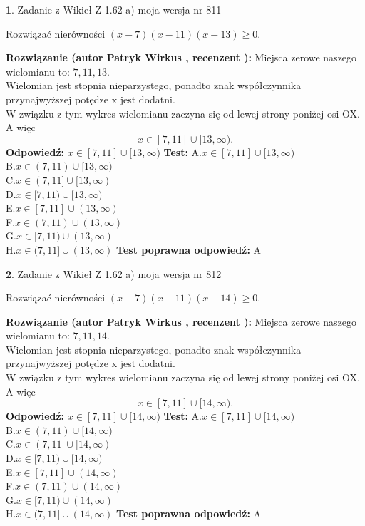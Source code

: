 \documentclass[12pt, a4paper]{article}
\theoremstyle{definition} %
\newtheorem{zad}{}
\newcommand{\zadStart}[1]{\begin{zad}#1\newline}
\newcommand{\zadStop}{\end{zad}}
\newcommand{\rozwStart}[2]{\noindent \textbf{Rozwiązanie (autor #1 , recenzent #2): }\newline}
\newcommand{\rozwStop}{\newline}
\newcommand{\odpStart}{\noindent \textbf{Odpowiedź:}\newline}
\newcommand{\odpStop}{\newline}
\newcommand{\testStart}{\noindent \textbf{Test:}\newline}
\newcommand{\testStop}{\newline}
\newcommand{\kluczStart}{\noindent \textbf{Test poprawna odpowiedź:}\newline}
\newcommand{\kluczStop}{\newline}
\begin{document}
\zadStart{Zadanie z Wikieł Z 1.62 a) moja wersja nr 811}

Rozwiązać nierówności $(x-7)(x-11)(x-13)\ge0$.
\zadStop
\rozwStart{Patryk Wirkus}{}
Miejsca zerowe naszego wielomianu to: $7, 11, 13$.\\
Wielomian jest stopnia nieparzystego, ponadto znak współczynnika przy\linebreak najwyższej potędze x jest dodatni.\\ W związku z tym wykres wielomianu zaczyna się od lewej strony poniżej osi OX. A więc $$x \in [7,11] \cup [13,\infty).$$
\rozwStop
\odpStart
$x \in [7,11] \cup [13,\infty)$
\odpStop
\testStart
A.$x \in [7,11] \cup [13,\infty)$\\
B.$x \in (7,11) \cup [13,\infty)$\\
C.$x \in (7,11] \cup [13,\infty)$\\
D.$x \in [7,11) \cup [13,\infty)$\\
E.$x \in [7,11] \cup (13,\infty)$\\
F.$x \in (7,11) \cup (13,\infty)$\\
G.$x \in [7,11) \cup (13,\infty)$\\
H.$x \in (7,11] \cup (13,\infty)$
\testStop
\kluczStart
A
\kluczStop



\zadStart{Zadanie z Wikieł Z 1.62 a) moja wersja nr 812}

Rozwiązać nierówności $(x-7)(x-11)(x-14)\ge0$.
\zadStop
\rozwStart{Patryk Wirkus}{}
Miejsca zerowe naszego wielomianu to: $7, 11, 14$.\\
Wielomian jest stopnia nieparzystego, ponadto znak współczynnika przy\linebreak najwyższej potędze x jest dodatni.\\ W związku z tym wykres wielomianu zaczyna się od lewej strony poniżej osi OX. A więc $$x \in [7,11] \cup [14,\infty).$$
\rozwStop
\odpStart
$x \in [7,11] \cup [14,\infty)$
\odpStop
\testStart
A.$x \in [7,11] \cup [14,\infty)$\\
B.$x \in (7,11) \cup [14,\infty)$\\
C.$x \in (7,11] \cup [14,\infty)$\\
D.$x \in [7,11) \cup [14,\infty)$\\
E.$x \in [7,11] \cup (14,\infty)$\\
F.$x \in (7,11) \cup (14,\infty)$\\
G.$x \in [7,11) \cup (14,\infty)$\\
H.$x \in (7,11] \cup (14,\infty)$
\testStop
\kluczStart
A
\kluczStop
\end{document}
